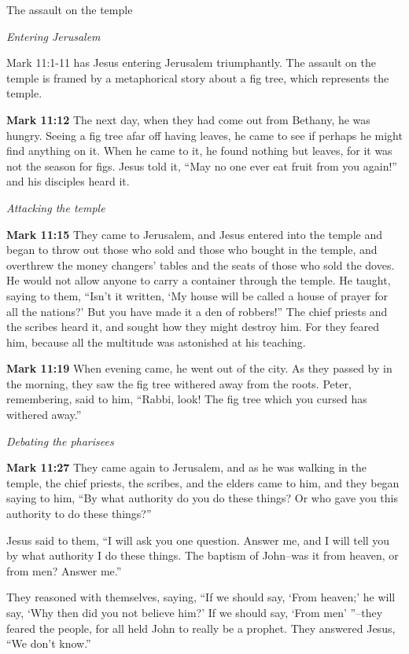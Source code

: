 \documentclass[10pt,twoside]{book}
\newcommand{\quotesize}{\normalsize{}}
\newcommand{\comm}[1]{\begingroup \color{black!50} #1\endgroup}
\newenvironment{quotetext}{\begingroup\quotesize}{\endgroup}
\newcommand{\bible}[2]{\begin{quotetext}\textbf{#1} #2\end{quotetext}}
\newcommand{\gospelmark}[2]{\bible{Mark #1}{#2}}
\newcommand{\subhead}[1]{\emph{#1}\par}
\begin{document}
\begin{section}{The assault on the temple}

\subhead{Entering Jerusalem}

\comm{Mark 11:1-11 has Jesus entering Jerusalem triumphantly. The assault on the temple is framed by
a metaphorical story about a fig tree, which represents the temple.}

\gospelmark{11:12}{ The next day, when they had come out from Bethany, he was hungry.   Seeing a fig tree afar off having leaves, he came to see if perhaps he might find anything on it. When he came to it, he found nothing but leaves, for it was not the season for figs.   Jesus told it, ``May no one ever eat fruit from you again!'' and his disciples heard it. }

\subhead{Attacking the temple}

\gospelmark{11:15}{
They came to Jerusalem, and Jesus entered into the temple and began to throw out those who sold and those who bought in the temple, and overthrew the money changers' tables and the seats of those who sold the doves.   He would not allow anyone to carry a container through the temple.   He taught, saying to them, ``Isn't it written, `My house will be called a house of prayer for all the nations?' But you have made it a den of robbers!''
  The chief priests and the scribes heard it, and sought how they might destroy him. For they feared him, because all the multitude was astonished at his teaching. 
}

\gospelmark{11:19}{
When evening came, he went out of the city.   As they passed by in the morning, they saw the fig tree withered away from the roots.   Peter, remembering, said to him, ``Rabbi, look! The fig tree which you cursed has withered away.''
}

\subhead{Debating the pharisees}

\gospelmark{11:27}{
They came again to Jerusalem, and as he was walking in the temple, the chief priests, the scribes, and the elders came to him,   and they began saying to him, ``By what authority do you do these things? Or who gave you this authority to do these things?''

  Jesus said to them, ``I will ask you one question. Answer me, and I will tell you by what authority I do these things.    The baptism of John--was it from heaven, or from men? Answer me.''

  They reasoned with themselves, saying, ``If we should say, `From heaven;' he will say, `Why then did you not believe him?'   If we should say, `From men' ''--they feared the people, for all held John to really be a prophet.   They answered Jesus, ``We don't know.''

}
\end{section}
\end{document}
